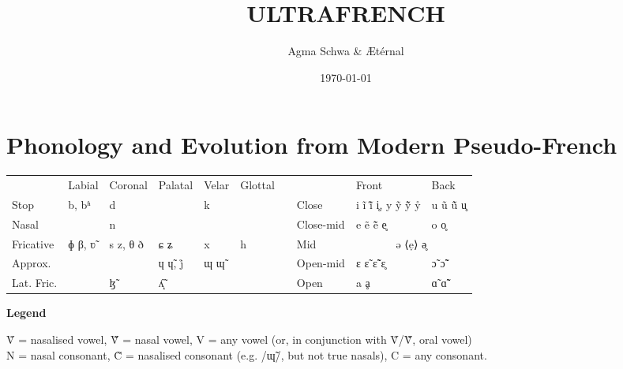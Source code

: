 \documentclass[a4paper, 12pt, oneside, final]{article}
\title{ULTRAFRENCH}
\author{Agma Schwa \& Ætérnal}
\date{\today}
\def \e {ẹ}
\def\parheading#1{\noindent\textbf{#1}}
\begin{document}
\maketitle
\thispagestyle{empty}
\clearpage
\setcounter{page}{1}

\section{Phonology and Evolution from Modern Pseudo-French}\label{sec:phonology}{\def\arraystretch{1.25}\setlength{\tabcolsep}{.4em}
\noindent\begin{tabular}{@{}|l|l|l|l|l|l|l@{\quad}|l|l|l|}                                                   \cline{1-6} \cline{8-10}
               & Labial & Coronal  & Palatal  & Velar & Glottal &&           & Front        & Back        \\ \cline{1-6} \cline{8-10}
    Stop       & b, bʱ  & d        &          & k     &         && Close     & i ĩ ĩ̃ i̥, y ỹ ỹ̃ ẙ & u ũ ũ̃ u̥ \\ \cline{1-6} \cline{8-10}
    Nasal      &        & n        &          &       &         && Close-mid & e ẽ ẽ̃ e̥      & o o̥         \\ \cline{1-6} \cline{8-10}
    Fricative  & ɸ β, ʋ̃ & s z, θ ð & ɕ ʑ      & x     & h       && Mid       & \multicolumn{2}{c|}{ə ⟨\e{}⟩ ə̥}   \\ \cline{1-6} \cline{8-10}
    Approx.    &        &          & ɥ ɥ̃, j̊   & ɰ ɰ̃   &         && Open-mid  & ɛ ɛ̃ ɛ̃̃ ɛ̥      & ɔ̃ ɔ̃̃         \\ \cline{1-6} \cline{8-10}
    Lat. Fric. &        & ɮ̃        & ʎ̝̃        &       &         && Open      & a ḁ          & ɑ̃ ɑ̃̃         \\ \cline{1-6} \cline{8-10}
\end{tabular}}\bigskip

\parheading{Legend}\par\noindent
Ṽ = nasalised vowel, Ṽ̃ = nasal vowel, V = any vowel (or, in conjunction with Ṽ/Ṽ̃, oral vowel)\\
N = nasal consonant, C̃ = nasalised consonant (e.g. /ɰ̃/, but not true nasals), C = any consonant.\medskip
\end{document}
